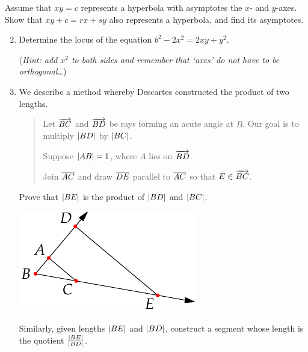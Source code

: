 \begin{exercises}{}{}
	\exstart %
	Assume that $xy=c$ represents a hyperbola with asymptotes the $x$- and $y$-axes. Show that $xy+c=rx+sy$ also represents a hyperbola, and find its asymptotes.
	\begin{enumerate}\setcounter{enumi}{1}
	  \item%
	  Determine the locus of the equation $b^2-2x^2=2xy+y^2$.\par
	  (\emph{Hint: add $x^2$ to both sides and remember that `axes' do not have to be orthogonal\ldots})
	  
	  \item%
	  We describe a method whereby Descartes constructed the product of two lengths.\par
	  \begin{minipage}[t]{0.68\linewidth}\vspace{-5pt}
		  \begin{quote}
		  	Let $\overrightarrow{BC}$ and $\overrightarrow{BD}$ be rays forming an acute angle at $B$. Our goal is to multiply $\left| BD\right|$ by $\left| BC\right|$.\par
		  	Suppose $\left| AB\right|=1$, where $A$ lies on $\overrightarrow{BD}$. \par
		  	Join $\overline{AC}$ and draw $\overline{DE}$ parallel to $\overline{AC}$ so that $E\in\overrightarrow{BC}$.
		  \end{quote}
		  Prove that $\left| BE\right|$ is the product of $\left| BD\right|$ and $\left| BC\right|$.
	  \end{minipage}
	  \hfill
	  \begin{minipage}[t]{0.31\linewidth}\vspace{-10pt}
	  	\flushright\includegraphics{descartes-product}
	  \end{minipage}
	  \smallbreak
	  Similarly, given lengths $\left| BE\right|$ and $\left| BD\right|$, construct a segment whose length is the quotient $\frac{\left| BE\right|}{\left| BD\right|}$.
	  

\end{enumerate}
\end{exercises}
